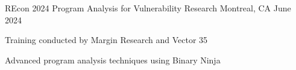 \begin{cventries}

  \cventry
    {REcon 2024} %
    {Program Analysis for Vulnerability Research} %
    {Montreal, CA} %
    {June 2024} %
    {
      \begin{cvitems} %
        \item {Training conducted by Margin Research and Vector 35}
        \item {Advanced program analysis techniques using Binary Ninja}
      \end{cvitems}
    }

\vspace{1em}

\end{cventries}
